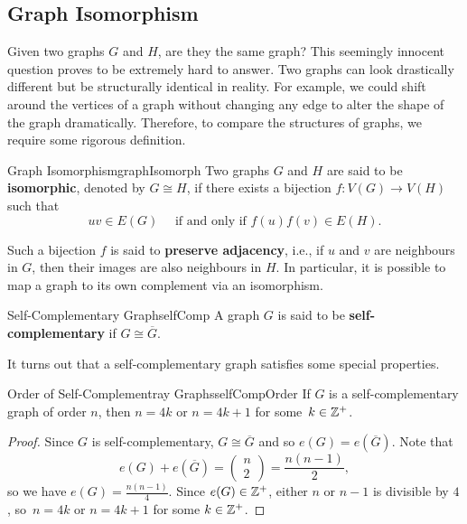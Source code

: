 \documentclass[math, code]{amznotes}
\theoremstyle{remark}
\begin{document}
\subsection{Graph Isomorphism}
Given two graphs $G$ and $H$, are they the same graph? This seemingly innocent question proves to be extremely hard to answer. Two graphs can look drastically different but be structurally identical in reality. For example, we could shift around the vertices of a graph without changing any edge to alter the shape of the graph dramatically. Therefore, to compare the structures of graphs, we require some rigorous definition.
\begin{dfnbox}{Graph Isomorphism}{graphIsomorph}
    Two graphs $G$ and $H$ are said to be {\color{red} \textbf{isomorphic}}, denoted by $G \cong H$, if there exists a bijection $f \colon V(G) \to V(H)$ such that
    \begin{equation*}
        uv \in E(G) \quad\textrm{ if and only if } f(u)f(v) \in E(H).
    \end{equation*}
\end{dfnbox}
Such a bijection $f$ is said to \textbf{preserve adjacency}, i.e., if $u$ and $v$ are neighbours in $G$, then their images are also neighbours in $H$. In particular, it is possible to map a graph to its own complement via an isomorphism.
\begin{dfnbox}{Self-Complementary Graph}{selfComp}
    A graph $G$ is said to be {\color{red} \textbf{self-complementary}} if $G \cong \overline{G}$.
\end{dfnbox}
It turns out that a self-complementary graph satisfies some special properties.
\begin{probox}{Order of Self-Complementray Graphs}{selfCompOrder}
    If $G$ is a self-complementary graph of order $n$, then $n = 4k$ or $n = 4k + 1$ for some~$k \in \mathbb{Z}^+$.
    \tcblower
    \begin{proof}
        Since $G$ is self-complementary, $G \cong \overline{G}$ and so $e(G) = e\left(\overline{G}\right)$. Note that
        \begin{equation*}
            e(G) + e\left(\overline{G}\right) = \begin{pmatrix}
                n \\
                2
            \end{pmatrix} = \frac{n(n - 1)}{2},
        \end{equation*}
        so we have $e(G) = \frac{n(n - 1)}{4}$. Since $e(G) \in \mathbb{Z}^+$, either $n$ or $n - 1$ is divisible by $4$, so~$n = 4k$ or $n = 4k + 1$ for some $k \in \mathbb{Z}^+$.
    \end{proof}
\end{probox}
\end{document}
